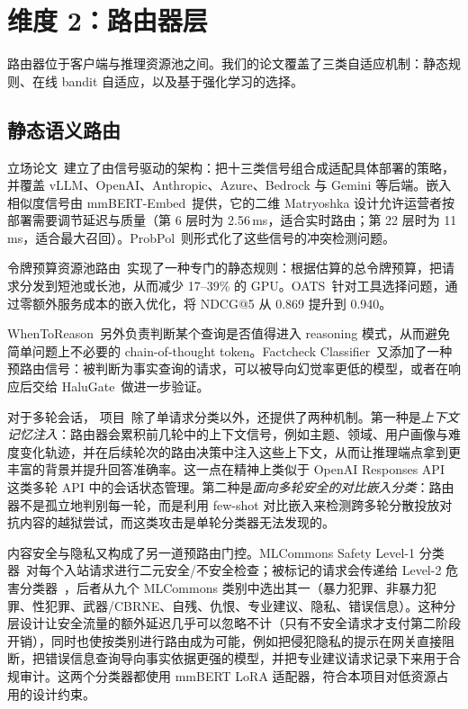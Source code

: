 \section{维度 2：路由器层}
\label{sec:router}

路由器位于客户端与推理资源池之间。我们的论文覆盖了三类自适应机制：静态规则、在线 bandit 自适应，以及基于强化学习的选择。

\subsection{静态语义路由}
\label{sec:router:static}

\vsr{} 立场论文~\cite{vllmsr2026}建立了由信号驱动的架构：把十三类信号组合成适配具体部署的策略，并覆盖 vLLM、OpenAI、Anthropic、Azure、Bedrock 与 Gemini 等后端。嵌入相似度信号由 mmBERT-Embed~\cite{mmberted2025}提供，它的二维 Matryoshka 设计允许运营者按部署需要调节延迟与质量（第 6 层时为 2.56\,ms，适合实时路由；第 22 层时为 11\,ms，适合最大召回）。ProbPol~\cite{probpol2026}则形式化了这些信号的冲突检测问题。

令牌预算资源池路由~\cite{poolrouting2026}实现了一种专门的静态规则：根据估算的总令牌预算，把请求分发到短池或长池，从而减少 17--39\% 的 GPU。OATS~\cite{oats2026}针对工具选择问题，通过零额外服务成本的嵌入优化，将 NDCG@5 从 0.869 提升到 0.940。

WhenToReason~\cite{wang2025reason}另外负责判断某个查询是否值得进入 reasoning 模式，从而避免简单问题上不必要的 chain-of-thought token。Factcheck Classifier~\cite{factcheck2026}又添加了一种预路由信号：被判断为事实查询的请求，可以被导向幻觉率更低的模型，或者在响应后交给 HaluGate~\cite{halugate2025}做进一步验证。

对于多轮会话，\vsr{} 项目~\cite{vllmsr2026}除了单请求分类以外，还提供了两种机制。第一种是\emph{上下文记忆注入}：路由器会累积前几轮中的上下文信号，例如主题、领域、用户画像与难度变化轨迹，并在后续轮次的路由决策中注入这些上下文，从而让推理端点拿到更丰富的背景并提升回答准确率。这一点在精神上类似于 OpenAI Responses API 这类多轮 API 中的会话状态管理。第二种是\emph{面向多轮安全的对比嵌入分类}：路由器不是孤立地判别每一轮，而是利用 few-shot 对比嵌入来检测跨多轮分散投放对抗内容的越狱尝试，而这类攻击是单轮分类器无法发现的。

内容安全与隐私又构成了另一道预路由门控。MLCommons Safety Level-1 分类器~\cite{safetyl1_2026}对每个入站请求进行二元安全/不安全检查；被标记的请求会传递给 Level-2 危害分类器~\cite{safetyl2_2026}，后者从九个 MLCommons 类别中选出其一（暴力犯罪、非暴力犯罪、性犯罪、武器/CBRNE、自残、仇恨、专业建议、隐私、错误信息）。这种分层设计让安全流量的额外延迟几乎可以忽略不计（只有不安全请求才支付第二阶段开销），同时也使按类别进行路由成为可能，例如把侵犯隐私的提示在网关直接阻断，把错误信息查询导向事实依据更强的模型，并把专业建议请求记录下来用于合规审计。这两个分类器都使用 mmBERT LoRA 适配器，符合本项目对低资源占用的设计约束。

